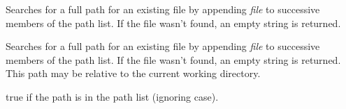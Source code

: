 \label{wxpathlistfindabsolutepath}


Searches for a full path for an existing file by appending {\it file} to
successive members of the path list.  If the file wasn't found, an empty
string is returned.


\label{wxpathlistfindvalidpath}


Searches for a full path for an existing file by appending {\it file} to
successive members of the path list.  If the file wasn't found, an empty string
is returned. This path may be relative to the current working directory.


\label{wxpathlistmember}


true if the path is in the path list (ignoring case).

